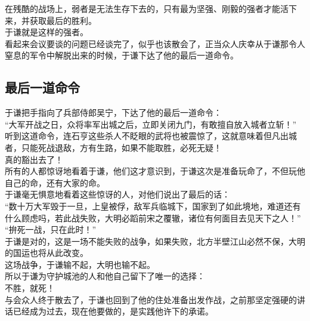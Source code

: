 \begin{multicols}{\theparacolNo}
在残酷的战场上，弱者是无法生存下去的，只有最为坚强、刚毅的强者才能活下来，并获取最后的胜利。\\

于谦就是这样的强者。\\

看起来会议要谈的问题已经谈完了，似乎也该散会了，正当众人庆幸从于谦那令人窒息的军令中解脱出来的时候，于谦下达了他的最后一道命令。\\

\subsection{最后一道命令}
于谦把手指向了兵部侍郎吴宁，下达了他的最后一道命令：\\

“大军开战之日，众将率军出城之后，立即关闭九门，有敢擅自放入城者立斩！”\\

听到这道命令，连石亨这些杀人不眨眼的武将也被震惊了，这就意味着但凡出城者，只能死战退敌，方有生路，如果不能取胜，必死无疑！\\

真的豁出去了！\\

所有的人都惊讶地看着于谦，他们这才意识到，于谦这次是准备玩命了，不但玩他自己的命，还有大家的命。\\

于谦毫无惧意地看着这些惊讶的人，对他们说出了最后的话：\\

“数十万大军毁于一旦，上皇被俘，敌军兵临城下，国家到了如此境地，难道还有什么顾虑吗，若此战失败，大明必蹈前宋之覆辙，诸位有何面目去见天下之人！”\\

“拚死一战，只在此时！”\\

于谦是对的，这是一场不能失败的战争，如果失败，北方半壁江山必然不保，大明的国运也将从此改变。\\

这场战争，于谦输不起，大明也输不起。\\

所以于谦为守护城池的人和他自己留下了唯一的选择：\\

不胜，就死！\\

与会众人终于散去了，于谦也回到了他的住处准备出发作战，之前那坚定强硬的讲话已经成为过去，现在他要做的，是实践他许下的承诺。\\


\end{multicols}
